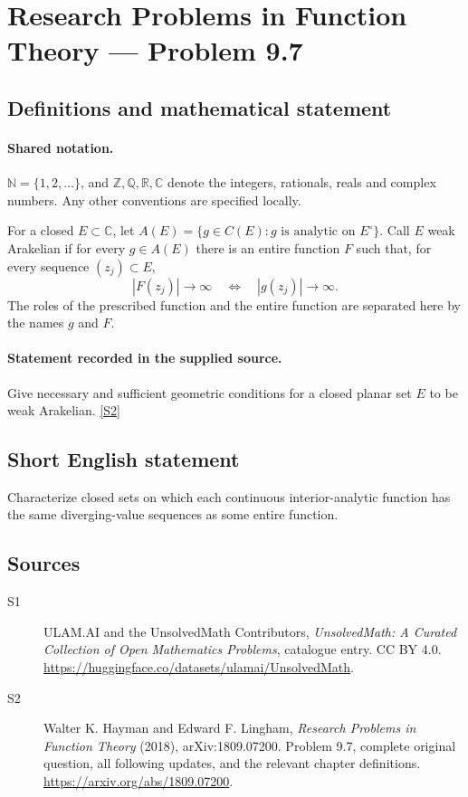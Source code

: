 \documentclass[11pt]{book}
\newcommand{\sref}[2]{\hyperlink{source:#1:#2}{[S#2]}}
\begin{document}
\section{Research Problems in Function Theory — Problem 9.7}\label{statement}

\subsection{Definitions and mathematical statement}

\paragraph{Shared notation.}$\mathbb N=\{1,2,\ldots\}$, and $\mathbb Z,\mathbb Q,\mathbb R,\mathbb C$ denote the integers, rationals, reals and complex numbers. Any other conventions are specified locally.


For a closed $E\subset\mathbb C$, let $A(E)=\{g\in C(E):g\text{ is analytic on }E^{\circ}\}$. Call $E$ weak Arakelian if for every $g\in A(E)$ there is an entire function $F$ such that, for every sequence $(z_j)\subset E$, \[|F(z_j)|\to\infty\quad\Longleftrightarrow\quad |g(z_j)|\to\infty.\] The roles of the prescribed function and the entire function are separated here by the names $g$ and $F$.
\paragraph{Statement recorded in the supplied source.}
Give necessary and sufficient geometric conditions for a closed planar set $E$ to be weak Arakelian. \sref{statement}{2}
\subsection{Short English statement}
Characterize closed sets on which each continuous interior-analytic function has the same diverging-value sequences as some entire function.
\subsection{Sources}
\begin{description}
\item[\hypertarget{source:statement:1}{S1}] ULAM.AI and the UnsolvedMath Contributors, \emph{UnsolvedMath: A Curated Collection of Open Mathematics Problems}, catalogue entry. CC BY 4.0. \url{https://huggingface.co/datasets/ulamai/UnsolvedMath}.
\item[\hypertarget{source:statement:2}{S2}] Walter K. Hayman and Edward F. Lingham, \emph{Research Problems in Function Theory} (2018), arXiv:1809.07200. Problem 9.7, complete original question, all following updates, and the relevant chapter definitions. \url{https://arxiv.org/abs/1809.07200}.
\end{description}
\label{end:statement}
\end{document}
